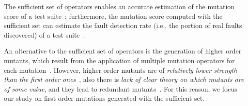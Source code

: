 The sufficient set of operators enables an accurate estimation of the mutation score of a test suite~\cite{siami2008sufficient}; furthermore, the mutation score computed with the sufficient set can estimate the fault detection rate (i.e., the portion of real faults discovered) of a test suite~\cite{andrews2005mutation}. 

An alternative to the sufficient set of operators is the generation of higher order mutants, which result from the application of multiple mutation operators for each mutation~\cite{jia2009higher,kintis2010evaluating,offutt1992investigations,papadakis2010empirical}. However, higher order mutants are of \emph{relatively lower strength than the first order ones}~\cite{papadakis2010mutation,papadakis2019mutation}, also there is \emph{lack of clear theory on which mutants are of some value}, and they lead to redundant mutants~\cite{papadakis2019mutation}. For this reason, we focus our study on first order mutations generated with the sufficient set.

%
%
%


%
%

